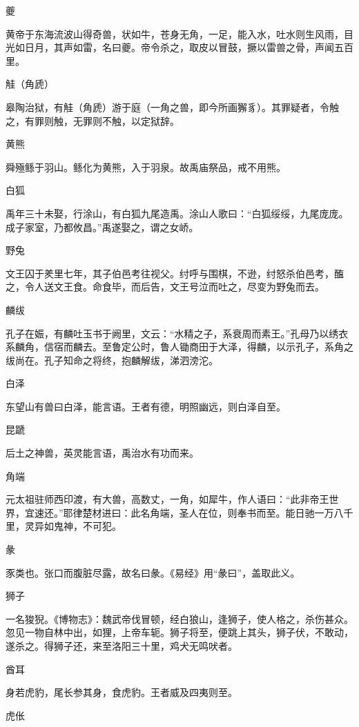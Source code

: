 \documentclass[a4paper,12pt,UTF8,twoside]{ctexbook}
\begin{document}
    夔
    
    黄帝于东海流波山得奇兽，状如牛，苍身无角，一足，能入水，吐水则生风雨，目光如日月，其声如雷，名曰夔。帝令杀之，取皮以冒鼓，撅以雷兽之骨，声闻五百里。
    
    觟（角虒）
    
    皋陶治狱，有觟（角虒）游于庭（一角之兽，即今所画獬豸）。其罪疑者，令触之，有罪则触，无罪则不触，以定狱辞。
    
    黄熊
    
    舜殛鲧于羽山。鲧化为黄熊，入于羽泉。故禹庙祭品，戒不用熊。
    
    白狐
    
    禹年三十未娶，行涂山，有白狐九尾造禹。涂山人歌曰：“白狐绥绥，九尾庞庞。成子家室，乃都攸昌。”禹遂娶之，谓之女峤。
    
    野兔
    
    文王囚于羑里七年，其子伯邑考往视父。纣呼与围棋，不逊，纣怒杀伯邑考，醢之，令人送文王食。命食毕，而后告，文王号泣而吐之，尽变为野兔而去。
    
    麟绂
    
    孔子在娠，有麟吐玉书于阙里，文云：“水精之子，系衰周而素王。”孔母乃以绣衣系麟角，信宿而麟去。至鲁定公时，鲁人锄商田于大泽，得麟，以示孔子，系角之绂尚在。孔子知命之将终，抱麟解绂，涕泗滂沱。
    
    白泽
    
    东望山有兽曰白泽，能言语。王者有德，明照幽远，则白泽自至。
    
    昆蹏
    
    后土之神兽，英灵能言语，禹治水有功而来。
    
    角端
    
    元太祖驻师西印渡，有大兽，高数丈，一角，如犀牛，作人语曰：“此非帝王世界，宜速还。”耶律楚材进曰：此名角端，圣人在位，则奉书而至。能日驰一万八千里，灵异如鬼神，不可犯。
    
    彖
    
    豕类也。张口而腹脏尽露，故名曰彖。《易经》用“彖曰”，盖取此义。
    
    狮子
    
    一名狻猊。《博物志》：魏武帝伐冒顿，经白狼山，逢狮子，使人格之，杀伤甚众。忽见一物自林中出，如狸，上帝车轭。狮子将至，便跳上其头，狮子伏，不敢动，遂杀之。得狮子还，来至洛阳三十里，鸡犬无鸣吠者。
    
    酋耳
    
    身若虎豹，尾长参其身，食虎豹。王者威及四夷则至。
    
    虎伥
    
\end{document}

